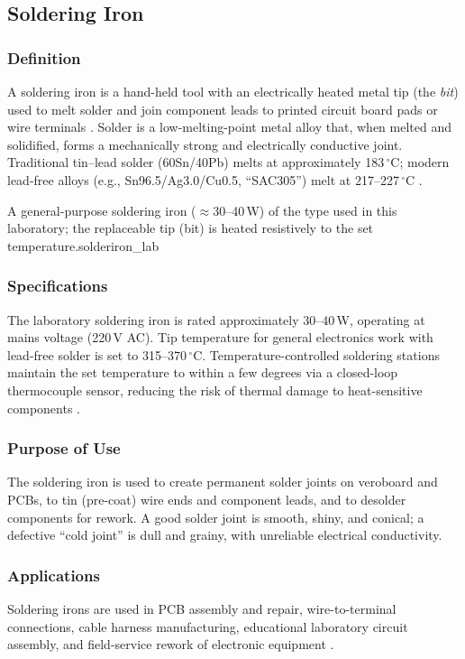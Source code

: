 \subsection{Soldering Iron}

\subsubsection*{Definition}
A soldering iron is a hand-held tool with an electrically heated metal tip (the
\textit{bit}) used to melt solder and join component leads to printed circuit board
pads or wire terminals \cite{wiki:solderiron}. Solder is a low-melting-point metal
alloy that, when melted and solidified, forms a mechanically strong and electrically
conductive joint. Traditional tin--lead solder (60Sn/40Pb) melts at approximately
183\,$^\circ$C; modern lead-free alloys (e.g., Sn96.5/Ag3.0/Cu0.5, ``SAC305'') melt at
217--227\,$^\circ$C \cite{wiki:solderiron}.

%
  {A general-purpose soldering iron ($\approx$30--40\,W) of the type used
   in this laboratory; the replaceable tip (bit) is heated resistively to the
   set temperature.}{solderiron_lab}

\subsubsection*{Specifications}
The laboratory soldering iron is rated approximately 30--40\,W, operating at mains
voltage (220\,V AC). Tip temperature for general electronics work with lead-free solder
is set to 315--370\,$^\circ$C. Temperature-controlled soldering stations maintain the
set temperature to within a few degrees via a closed-loop thermocouple sensor, reducing
the risk of thermal damage to heat-sensitive components \cite{wiki:solderiron}.

\subsubsection*{Purpose of Use}
The soldering iron is used to create permanent solder joints on veroboard and PCBs,
to tin (pre-coat) wire ends and component leads, and to desolder components for rework.
A good solder joint is smooth, shiny, and conical; a defective ``cold joint'' is dull
and grainy, with unreliable electrical conductivity.

\subsubsection*{Applications}
Soldering irons are used in PCB assembly and repair, wire-to-terminal connections,
cable harness manufacturing, educational laboratory circuit assembly, and field-service
rework of electronic equipment \cite{wiki:solderiron}.

